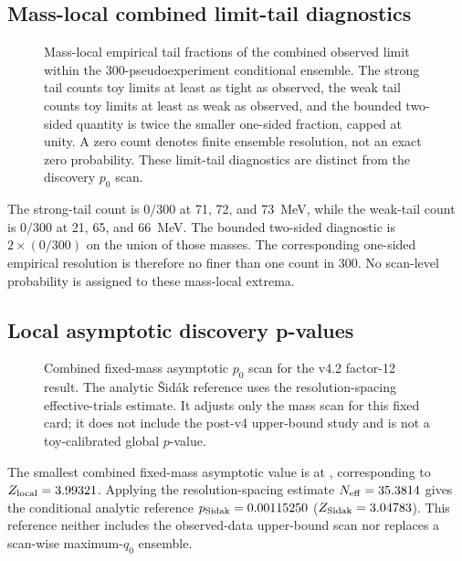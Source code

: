 \subsection{Mass-local combined limit-tail diagnostics}
\label{sec:results-v4p2-limit-tails}

\begin{figure}[H]
\centering
{}
\caption{Mass-local empirical tail fractions of the combined observed limit
within the 300-pseudoexperiment conditional ensemble. The strong tail counts toy
limits at least as tight as observed, the weak tail counts toy limits at least as
weak as observed, and the bounded two-sided quantity is twice the smaller
one-sided fraction, capped at unity. A zero count denotes finite ensemble
resolution, not an exact zero probability. These limit-tail diagnostics are
distinct from the discovery $p_0$ scan.}
\label{fig:results-v4p2-limit-tails}
\end{figure}

The strong-tail count is $0/300$ at 71, 72, and 73~MeV, while the weak-tail
count is $0/300$ at 21, 65, and 66~MeV. The bounded two-sided diagnostic is
$2\times(0/300)$ on the union of those masses. The corresponding one-sided
empirical resolution is therefore no finer than one count in 300. No scan-level
probability is assigned to these mass-local extrema.

\subsection{Local asymptotic discovery p-values}
\label{sec:results-v4p2-local-p0}
\label{sec:results-v4-local-p0}

\begin{figure}[H]
\centering
{}
\caption{Combined fixed-mass asymptotic $p_0$ scan for the v4.2 factor-12
result. The analytic \v{S}id\'ak reference uses the resolution-spacing
effective-trials estimate. It adjusts only the mass scan for this fixed card; it
does not include the post-v4 upper-bound study and is not a toy-calibrated global
$p$-value.}
\label{fig:results-v4p2-local-p0}
\end{figure}

The smallest combined fixed-mass asymptotic value is
\VFourPTwoLocalPZeroMinimum{} at \VFourPTwoLocalPZeroMass, corresponding to
$Z_{\mathrm{local}}=3.99321$. Applying the resolution-spacing estimate
$N_{\mathrm{eff}}=35.3814$ gives the conditional analytic
reference $p_{\mathrm{Sidak}}=0.00115250$
($Z_{\mathrm{Sidak}}=3.04783$). This reference neither includes the
observed-data upper-bound scan nor replaces a scan-wise maximum-$q_0$ ensemble.


